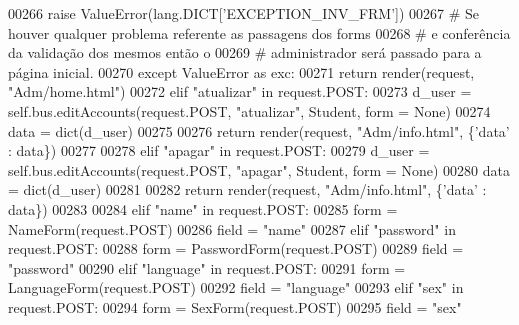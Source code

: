 \begin{DoxyCode}
00266                         \textcolor{keywordflow}{raise} ValueError(lang.DICT[\textcolor{stringliteral}{'EXCEPTION\_INV\_FRM'}])
00267                 \textcolor{comment}{# Se houver qualquer problema referente as passagens dos forms 
}
00268                 \textcolor{comment}{#   e conferência da validação dos mesmos então o 
}
00269                 \textcolor{comment}{#   administrador será passado para a página inicial.
}
00270                 \textcolor{keywordflow}{except} ValueError \textcolor{keyword}{as} exc:
00271                     \textcolor{keywordflow}{return} render(request, \textcolor{stringliteral}{"Adm/home.html"})
00272             \textcolor{keywordflow}{elif} \textcolor{stringliteral}{"atualizar"} \textcolor{keywordflow}{in} request.POST:
00273                 d\_user = self.bus.editAccounts(request.POST, \textcolor{stringliteral}{"atualizar"}, Student, form = \textcolor{keywordtype}{None})
00274                 data = dict(d\_user)
00275 
00276                 \textcolor{keywordflow}{return} render(request, \textcolor{stringliteral}{"Adm/info.html"}, \{\textcolor{stringliteral}{'data'} : data\})
00277             
00278             \textcolor{keywordflow}{elif} \textcolor{stringliteral}{"apagar"} \textcolor{keywordflow}{in} request.POST:
00279                 d\_user = self.bus.editAccounts(request.POST, \textcolor{stringliteral}{"apagar"}, Student, form = \textcolor{keywordtype}{None})
00280                 data = dict(d\_user)
00281 
00282                 \textcolor{keywordflow}{return} render(request, \textcolor{stringliteral}{"Adm/info.html"}, \{\textcolor{stringliteral}{'data'} : data\})
00283 
00284             \textcolor{keywordflow}{elif} \textcolor{stringliteral}{"name"} \textcolor{keywordflow}{in} request.POST:
00285                 form = NameForm(request.POST)
00286                 field = \textcolor{stringliteral}{"name"}
00287             \textcolor{keywordflow}{elif}  \textcolor{stringliteral}{"password"} \textcolor{keywordflow}{in} request.POST:
00288                 form = PasswordForm(request.POST)
00289                 field = \textcolor{stringliteral}{"password"}
00290             \textcolor{keywordflow}{elif} \textcolor{stringliteral}{"language"} \textcolor{keywordflow}{in} request.POST:
00291                 form = LanguageForm(request.POST)
00292                 field = \textcolor{stringliteral}{"language"}
00293             \textcolor{keywordflow}{elif} \textcolor{stringliteral}{"sex"} \textcolor{keywordflow}{in} request.POST:
00294                 form = SexForm(request.POST)
00295                 field = \textcolor{stringliteral}{"sex"}

\end{DoxyCode}
